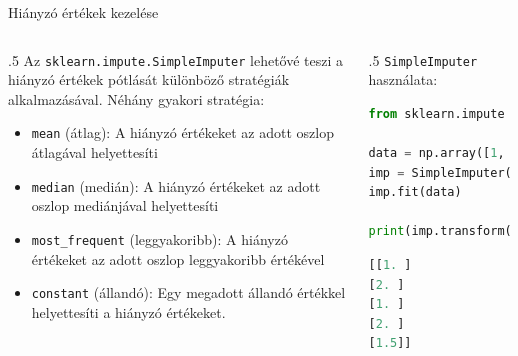 \documentclass[english, aspectratio=169]{beamer}
\begin{document}
\begin{frame}[fragile]{Hiányzó értékek kezelése}
	\begin{columns}
		\begin{column}{.5\textwidth}
			Az \texttt{sklearn.impute.SimpleImputer} lehetővé teszi a hiányzó értékek pótlását különböző stratégiák alkalmazásával. Néhány gyakori stratégia:
			\begin{itemize}
				\item \texttt{mean} (átlag): A hiányzó értékeket az adott oszlop átlagával helyettesíti
				\item \texttt{median} (medián): A hiányzó értékeket az adott oszlop mediánjával helyettesíti
				\item \texttt{most\_frequent} (leggyakoribb): A hiányzó értékeket az adott oszlop leggyakoribb értékével
				\item \texttt{constant} (állandó): Egy megadott állandó értékkel helyettesíti a hiányzó értékeket.
			\end{itemize}			
		\end{column}
		\begin{column}{.5\textwidth}
			\texttt{SimpleImputer}  használata:
			\begin{lstlisting}[language=python]
from sklearn.impute import SimpleImputer

data = np.array([1, 2, 1, 2, np.nan]).reshape(-1, 1)
imp = SimpleImputer(strategy='mean')
imp.fit(data)

print(imp.transform(data))
			\end{lstlisting}
			\begin{lstlisting}[language=python]
[[1. ]
[2. ]
[1. ]
[2. ]
[1.5]]
			\end{lstlisting}
		\end{column}
	\end{columns}
\end{frame}
\end{document}
